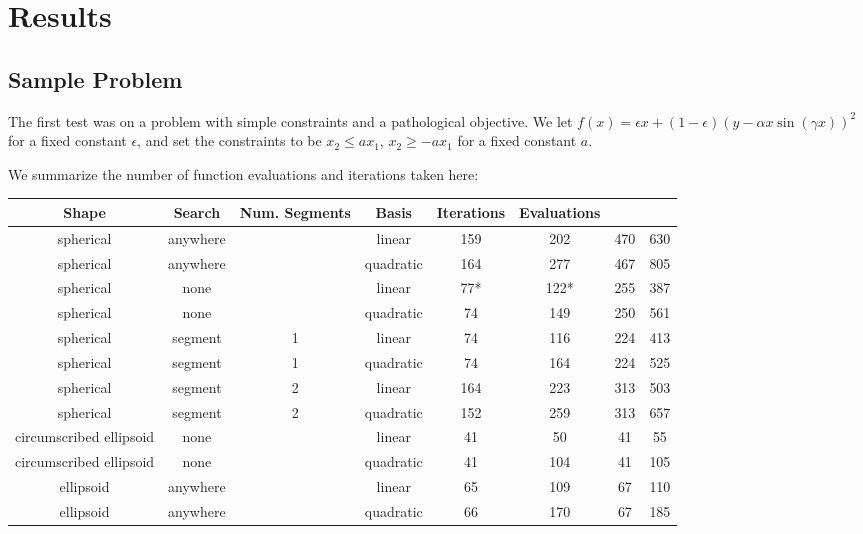 

\section{Results}


\subsection{Sample Problem}
The first test was on a problem with simple constraints and a pathological objective.
We let $f(x) = \epsilon x + (1-\epsilon)(y - \alpha x \sin(\gamma x))^2$ for a fixed constant $\epsilon$, and set the constraints to be
$x_2 \le ax_1$, $x_2 \ge -ax_1$ for a fixed constant $a$.

We summarize the number of function evaluations and iterations taken here:
\begin{center}
\begin{tabular}{ c c c c c c c c }
Shape & Search & Num. Segments & Basis & Iterations & Evaluations \\
\hline
                spherical &   anywhere &       &     linear & 159  &   202  &  470 &  630 \\
                spherical &   anywhere &       &  quadratic & 164  &   277  &  467 &  805 \\
                spherical &       none &       &     linear &  77* &   122* &  255 &  387 \\
                spherical &       none &       &  quadratic &  74  &   149  &  250 &  561 \\
                spherical &    segment &     1 &     linear &  74  &   116  &  224 &  413 \\
                spherical &    segment &     1 &  quadratic &  74  &   164  &  224 &  525 \\
                spherical &    segment &     2 &     linear & 164  &   223  &  313 &  503 \\
                spherical &    segment &     2 &  quadratic & 152  &   259  &  313 &  657 \\
  circumscribed ellipsoid &       none &       &     linear &  41  &    50  &   41 &   55 \\
  circumscribed ellipsoid &       none &       &  quadratic &  41  &   104  &   41 &  105 \\
                ellipsoid &   anywhere &       &     linear &  65  &   109  &   67 &  110 \\
                ellipsoid &   anywhere &       &  quadratic &  66  &   170  &   67 &  185 \\

\end{tabular}
\end{center}
